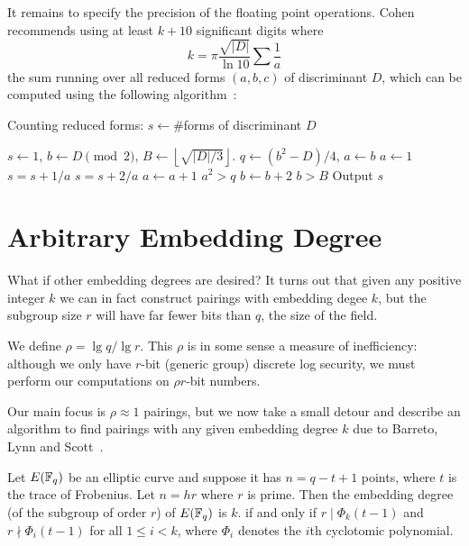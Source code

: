 It remains to specify the precision of the floating point operations.
Cohen recommends using at least $k + 10$ significant digits where
\[ k = \pi \frac{\sqrt{|D|}} {\ln 10} \sum \frac{1}{a} \]
the sum running over all reduced forms $(a,b,c)$ of discriminant $D$,
which can be computed using the following algorithm~\cite[Algorithm 5.3.5]{1993-cohen}:

\begin{algorithm}
\caption {Counting reduced forms: $s \gets \#$forms of discriminant $D$}
\begin{algorithmic}[1]
\STATE $s\gets 1$, $b\gets D \pmod 2$, $B\gets \left\lfloor \sqrt{|D|/3}
\right\rfloor$.
\REPEAT
    \REPEAT
	\STATE $q\gets (b^2 - D)/4$, $a\gets b$
	    \STATE $a\gets 1$
		\STATE $s=s+1/a$
	    \ELSE
		\STATE $s=s+2/a$
	    \ENDIF
	\ENDIF
	\STATE $a\gets a+1$
    \UNTIL $a^2>q$
    \STATE $b\gets b+2$
\UNTIL $b>B$
\STATE Output $s$
\end{algorithmic}
\end{algorithm}

\section {Arbitrary Embedding Degree}

What if other embedding degrees are desired? It turns out that given any
positive integer $k$ we can in fact construct pairings with embedding degee $k$,
but the subgroup size $r$ will have far fewer bits than $q$,
the size of the field.

We define $\rho = \lg q / \lg r$. This $\rho$ is in some sense
a measure of inefficiency: although we only have $r$-bit (generic group)
discrete log security, we must perform our computations on $\rho r$-bit numbers.

Our main focus is $\rho \approx 1$ pairings, but we now take a small detour
and describe an algorithm to find
pairings with any given embedding degree $k$ due to Barreto, Lynn and Scott~\cite{bals}.

\begin{lemma}
Let $E(\mathbb{F}_q)$ be an elliptic curve and suppose it has
$n = q - t + 1$ points, where $t$ is the trace of Frobenius.
Let $n = h r$ where $r$ is prime.
Then the embedding degree (of the subgroup of order $r$) of $E(\mathbb{F}_q)$ is $k$.
if and only if
$r \mid \Phi_k(t-1)$ and $r \nmid \Phi_i(t-1)$ for all $1 \le i < k$,
where $\Phi_i$ denotes the $i$th cyclotomic polynomial.
\end{lemma}

